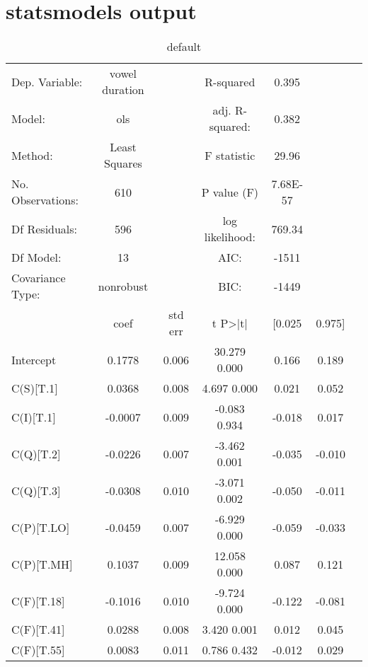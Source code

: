 \chapter{statsmodels output}
\begin{table}[htp]
\caption{default}
\begin{center}
\begin{tabular}{lcccccr}
                            \hline											
Dep. Variable:       	&	vowel duration	&		&	R-squared	&	0.395	&		\\
Model:               	&	ols	&		&	adj. R-squared:              	&	0.382	&		\\
Method:               	&	   Least Squares 	&		&	F statistic	&	29.96	&		\\
No. Observations:    	&	610	&		&	P value (F) 	&	7.68E-57	&		\\
Df Residuals:        	&	596	&		&	log likelihood:	&	769.34	&		\\
Df Model:            	&	13	&		&	AIC:	&	-1511	&		\\
Covariance Type:     	&	nonrobust	&		&	BIC:	&	-1449	&		\\
\hline 											
                     	&	     coef  	&	  std err  	&	        t      P>|t|      	&	[0.025      	&	0.975]	\\
\hline 											
Intercept            	&	0.1778	&	0.006	&	   30.279      0.000      	&	0.166	&	0.189	\\
C(S)[T.1]            	&	0.0368	&	0.008	&	    4.697      0.000      	&	0.021	&	0.052	\\
C(I)[T.1]            	&	-0.0007	&	0.009	&	   -0.083      0.934      	&	-0.018	&	0.017	\\
C(Q)[T.2]            	&	-0.0226	&	0.007	&	   -3.462      0.001      	&	-0.035	&	-0.010	\\
C(Q)[T.3]            	&	-0.0308	&	0.010	&	   -3.071      0.002      	&	-0.050	&	-0.011	\\
C(P)[T.LO]           	&	-0.0459	&	0.007	&	   -6.929      0.000      	&	-0.059	&	-0.033	\\
C(P)[T.MH]           	&	0.1037	&	0.009	&	   12.058      0.000      	&	0.087	&	0.121	\\
C(F)[T.18]           	&	-0.1016	&	0.010	&	   -9.724      0.000      	&	-0.122	&	-0.081	\\
C(F)[T.41]           	&	0.0288	&	0.008	&	    3.420      0.001      	&	0.012	&	0.045	\\
C(F)[T.55]           	&	0.0083	&	0.011	&	    0.786      0.432      	&	-0.012	&	0.029	\\

\end{tabular}
\end{center}
\end{table}

